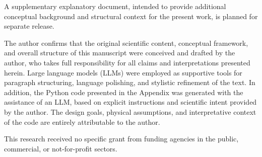 \documentclass[
 reprint,
 amsmath,amssymb,
 aps,
 prb,
]{revtex4-2}
\numberwithin{equation}{section}
\begin{document}
\smallskip

A supplementary explanatory document, intended to provide additional conceptual background and structural context for the present work, is planned for separate release.

\begin{acknowledgments}
The author confirms that the original scientific content, conceptual framework, and overall structure of this manuscript were conceived and drafted by the author, who takes full responsibility for all claims and interpretations presented herein. Large language models (LLMs) were employed as supportive tools for paragraph structuring, language polishing, and stylistic refinement of the text. In addition, the Python code presented in the Appendix was generated with the assistance of an LLM, based on explicit instructions and scientific intent provided by the author. The design goals, physical assumptions, and interpretative context of the code are entirely attributable to the author.

This research received no specific grant from funding agencies in the public, commercial, or not-for-profit sectors.
\end{acknowledgments}
\end{document}
